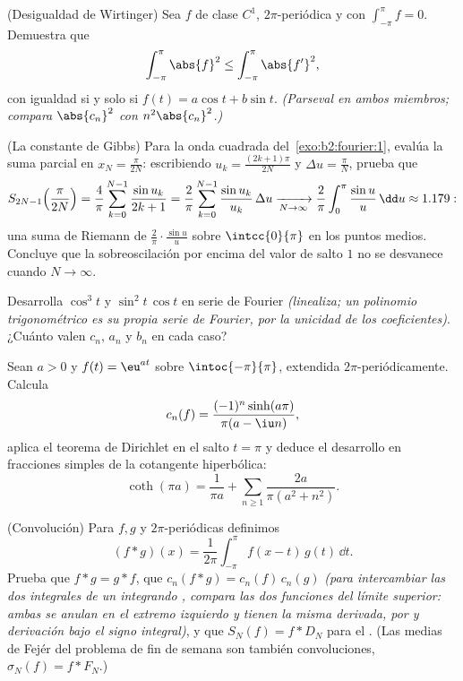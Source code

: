 \begin{exercise}[$\star\star\star$]\label{exo:b2:fourier:7}
(Desigualdad de Wirtinger) Sea $f$ de clase $C^1$,
$2\pi$-periódica y con $\int_{-\pi}^{\pi} f = 0$. Demuestra que
\[
\int_{-\pi}^{\pi} \abs{f}^2 \leq \int_{-\pi}^{\pi} \abs{f'}^2 ,
\]
con igualdad si y solo si $f(t) = a\cos t + b\sin t$. \emph{(Parseval
en ambos miembros; compara $\abs{c_n}^2$ con $n^2\abs{c_n}^2$.)}
\end{exercise}

\begin{exercise}[$\star\star\star$]\label{exo:b2:fourier:8}
(La constante de Gibbs) Para la onda cuadrada del~\cref{exo:b2:fourier:1}, evalúa la suma parcial en $x_N =
\frac{\pi}{2N}$: escribiendo $u_k = \frac{(2k+1)\pi}{2N}$ y $\Delta u
= \frac{\pi}{N}$, prueba que
\[
S_{2N-1}\Bigl(\frac{\pi}{2N}\Bigr)
= \frac{4}{\pi}\sum_{k=0}^{N-1} \frac{\sin u_k}{2k+1}
= \frac{2}{\pi}\sum_{k=0}^{N-1} \frac{\sin u_k}{u_k}\,\Delta u
\xrightarrow[N\to\infty]{}
\frac{2}{\pi}\int_0^{\pi}\frac{\sin u}{u}\,\dd u \approx 1.179 :
\]
una suma de Riemann de $\frac{2}{\pi}\cdot\frac{\sin u}{u}$ sobre
$\intcc{0}{\pi}$ en los puntos medios. Concluye que la
sobreoscilación por encima del valor de salto $1$ no se desvanece
cuando $N \to \infty$.
\end{exercise}

\begin{exercise}[$\star$]\label{exo:b2:fourier:9}
Desarrolla $\cos^3 t$ y $\sin^2 t\,\cos t$ en serie de Fourier
\emph{(linealiza; un polinomio trigonométrico es su propia serie de
Fourier, por la unicidad de los coeficientes)}. ¿Cuánto valen $c_n$,
$a_n$ y $b_n$ en cada caso?
\end{exercise}

\begin{exercise}[$\star\star$]\label{exo:b2:fourier:10}
Sean $a > 0$ y $f(t) = \eu^{at}$ sobre $\intoc{-\pi}{\pi}$,
extendida $2\pi$-periódicamente. Calcula
\[
c_n(f) = \frac{(-1)^n\sinh(a\pi)}{\pi(a - \iu n)} ,
\]
aplica el teorema de Dirichlet en el salto $t = \pi$ y deduce el
desarrollo en fracciones simples de la cotangente hiperbólica:
\[
\coth(\pi a) = \frac{1}{\pi a} + \sum_{n\geq1}
\frac{2a}{\pi(a^2 + n^2)} .
\]
\end{exercise}

\begin{exercise}[$\star\star$]\label{exo:b2:fourier:11}
(Convolución) Para $f, g$  y $2\pi$-periódicas definimos
\[
(f * g)(x) = \frac{1}{2\pi}\int_{-\pi}^{\pi} f(x - t)\,g(t)\,
\dd t .
\]
Prueba que $f * g = g * f$, que $c_n(f*g) = c_n(f)\,c_n(g)$
\emph{(para intercambiar las dos integrales de un integrando
, compara las dos funciones del límite superior: ambas se
anulan en el extremo izquierdo y tienen la misma derivada, por
 y derivación bajo el signo integral)}, y que $S_N(f) = f
* D_N$ para el . (Las medias de Fejér del
problema de fin de semana son también convoluciones, $\sigma_N(f) = f
* F_N$.)
\end{exercise}

